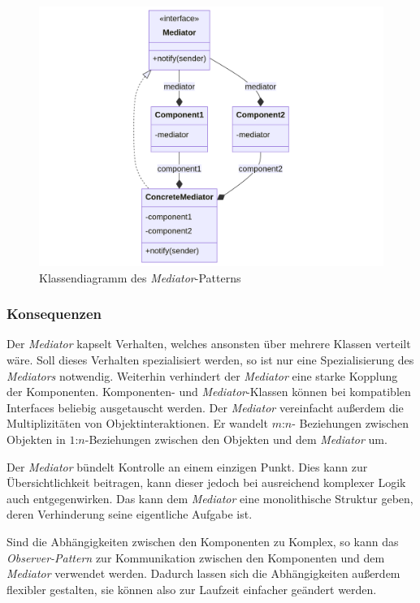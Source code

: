 \begin{figure}[!ht]
	\centering
	\includegraphics[width=0.75\linewidth]{images/patterns/mediator-class.png}
	\caption{Klassendiagramm des \emph{Mediator}-Patterns \cite{skobeleva_mediator_2023}}
	\label{fig:mediator-class}
\end{figure}

\subsubsection*{Konsequenzen}

Der \emph{Mediator} kapselt Verhalten, welches ansonsten über mehrere Klassen verteilt wäre. Soll dieses Verhalten spezialisiert werden, so ist nur eine Spezialisierung des \emph{Mediators} notwendig. Weiterhin verhindert der \emph{Mediator} eine starke Kopplung der Komponenten. Komponenten- und \emph{Mediator}-Klassen können bei kompatiblen Interfaces beliebig ausgetauscht werden. Der \emph{Mediator} vereinfacht außerdem die Multiplizitäten von Objektinteraktionen. Er wandelt $m$:$n$- Beziehungen zwischen Objekten in $1$:$n$-Beziehungen zwischen den Objekten und dem \emph{Mediator} um.

Der \emph{Mediator} bündelt Kontrolle an einem einzigen Punkt. Dies kann zur Übersichtlichkeit beitragen, kann dieser jedoch bei ausreichend komplexer Logik auch entgegenwirken. Das kann dem \emph{Mediator} eine monolithische Struktur geben, deren Verhinderung seine eigentliche Aufgabe ist.

Sind die Abhängigkeiten zwischen den Komponenten zu Komplex, so kann das \emph{Observer-Pattern} zur Kommunikation zwischen den Komponenten und dem \emph{Mediator} verwendet werden. Dadurch lassen sich die Abhängigkeiten außerdem flexibler gestalten, sie können also zur Laufzeit einfacher geändert werden. \cite{gamma_design_1995}